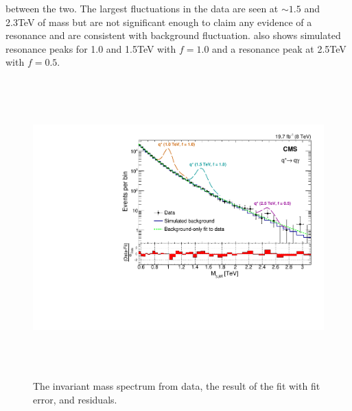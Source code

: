 between the two. The largest fluctuations in the data are seen  at $\sim1.5$ and 2.3\unit{TeV} of mass but are not significant enough to claim any
evidence of a resonance and are consistent with background fluctuation. \Fig{\ref{fig:massFit}} also shows simulated \qstar resonance peaks for 1.0
and 1.5\unit{TeV} with $f=1.0$ and a resonance peak at 2.5\unit{TeV} with $f = 0.5$.
\begin{figure}[h!]
\centering
 \includegraphics[width=15cm,height=11.5cm]{ch5/plots/DataMC/InvMass_DataFitMC_Paper_TeV.pdf}
 \caption{The \gamjet invariant mass spectrum from data, the result of the fit with fit error, and residuals.}
\label{fig:massFit}
\end{figure}

